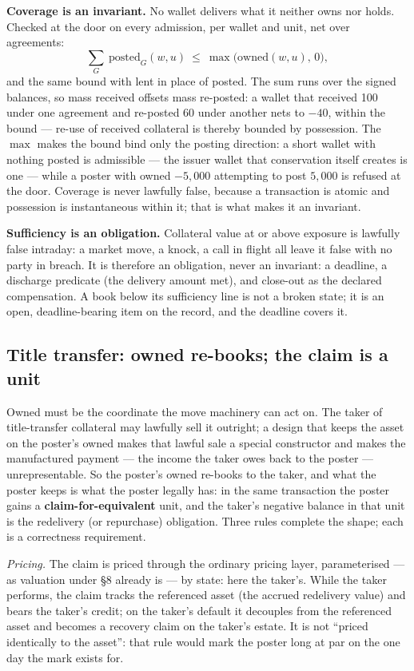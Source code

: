 \textbf{Coverage is an invariant.} No wallet delivers what it neither owns nor
holds. Checked at the door on every admission, per wallet and unit, net over
agreements:
\[
\sum_{G}\ \mathrm{posted}_G(w,u)\ \le\ \max\bigl(\mathrm{owned}(w,u),\,0\bigr),
\]
and the same bound with lent in place of posted. The sum runs over the signed
balances, so mass received offsets mass re-posted: a wallet that received 100
under one agreement and re-posted 60 under another nets to $-40$, within the
bound --- re-use of received collateral is thereby bounded by possession. The
$\max$ makes the bound bind only the posting direction: a short wallet with
nothing posted is admissible --- the issuer wallet that conservation itself
creates is one --- while a poster with owned $-5{,}000$ attempting to post
$5{,}000$ is refused at the door. Coverage is never lawfully false, because a
transaction is atomic and possession is instantaneous within it; that is what
makes it an invariant.

\textbf{Sufficiency is an obligation.} Collateral value at or above exposure
is lawfully false intraday: a market move, a knock, a call in flight all leave
it false with no party in breach. It is therefore an obligation, never an
invariant: a deadline, a discharge predicate (the delivery amount met), and
close-out as the declared compensation. A book below its sufficiency line is
not a broken state; it is an open, deadline-bearing item on the record, and
the deadline covers it.

\subsection{Title transfer: owned re-books; the claim is a unit}

Owned must be the coordinate the move machinery can act on. The taker of
title-transfer collateral may lawfully sell it outright; a design that keeps
the asset on the poster's owned makes that lawful sale a special constructor
and makes the manufactured payment --- the income the taker owes back to the
poster --- unrepresentable. So the poster's owned re-books to the taker, and
what the poster keeps is what the poster legally has: in the same transaction
the poster gains a \textbf{claim-for-equivalent} unit, and the taker's
negative balance in that unit is the redelivery (or repurchase) obligation.
Three rules complete the shape; each is a correctness requirement.

\emph{Pricing.} The claim is priced through the ordinary pricing layer,
parameterised --- as valuation under \S8 already is --- by state: here the
taker's. While the taker performs, the claim tracks the referenced asset (the
accrued redelivery value) and bears the taker's credit; on the taker's default
it decouples from the referenced asset and becomes a recovery claim on the
taker's estate. It is not ``priced identically to the asset'': that rule would
mark the poster long at par on the one day the mark exists for.

